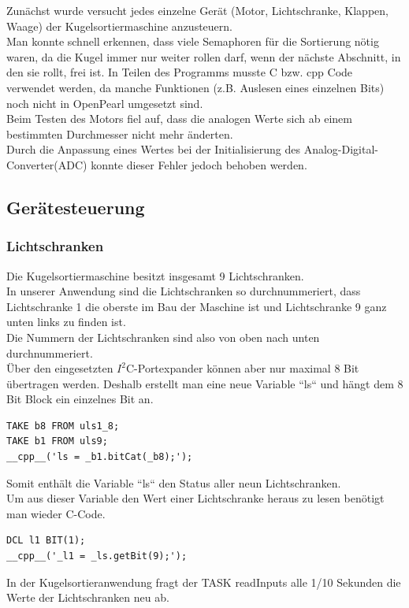 \noindent
Zunächst wurde versucht jedes einzelne Gerät (Motor, Lichtschranke, Klappen, Waage) der Kugelsortiermaschine anzusteuern.\\
Man konnte schnell erkennen, dass viele Semaphoren für die Sortierung nötig waren, da die Kugel immer nur weiter rollen darf, wenn der nächste Abschnitt, in den sie rollt, frei ist.
In Teilen des Programms musste C bzw. cpp Code verwendet werden, da manche Funktionen (z.B. Auslesen eines einzelnen Bits) noch nicht in OpenPearl umgesetzt sind.\\
Beim Testen des Motors fiel auf, dass die analogen Werte sich ab einem bestimmten Durchmesser nicht mehr änderten.\\ 
Durch die Anpassung eines Wertes bei der Initialisierung des Analog-Digital-Converter(ADC) konnte dieser Fehler jedoch behoben werden.\\
\newpage

\subsection{Gerätesteuerung}
\subsubsection{Lichtschranken}
Die Kugelsortiermaschine besitzt insgesamt 9 Lichtschranken.\\
In unserer Anwendung sind die Lichtschranken so durchnummeriert, dass Lichtschranke 1 die oberste im Bau der Maschine ist und Lichtschranke 9 ganz unten links zu finden ist.\\
Die Nummern der Lichtschranken sind also von oben nach unten durchnummeriert.\\
Über den eingesetzten $I^2$C-Portexpander können aber nur maximal 8 Bit übertragen werden.
Deshalb erstellt man eine neue Variable “ls“ und hängt dem 8 Bit Block ein einzelnes Bit an.\\
\begin{lstlisting}
TAKE b8 FROM uls1_8;
TAKE b1 FROM uls9;
__cpp__('ls = _b1.bitCat(_b8);');
\end{lstlisting}
Somit enthält die Variable “ls“ den Status aller neun Lichtschranken.\\
Um aus dieser Variable den Wert einer Lichtschranke heraus zu lesen benötigt man wieder C-Code.\\
\begin{lstlisting}
DCL l1 BIT(1);
__cpp__('_l1 = _ls.getBit(9);');
\end{lstlisting}
In der Kugelsortieranwendung fragt der TASK readInputs alle 1/10 Sekunden die Werte der Lichtschranken neu ab.\\
\clearpage
